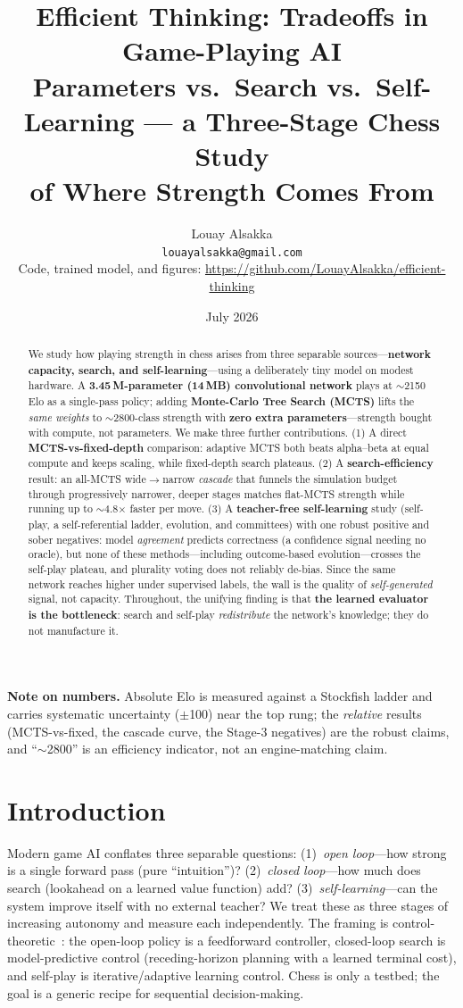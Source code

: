 \documentclass[11pt]{article}
\title{\textbf{Efficient Thinking: Tradeoffs in Game-Playing AI}\\[4pt]
\large Parameters vs.\ Search vs.\ Self-Learning --- a Three-Stage Chess Study\\ of Where Strength Comes From}
\author{Louay Alsakka\\ \small\texttt{louayalsakka@gmail.com}\\
\small Code, trained model, and figures: \url{https://github.com/LouayAlsakka/efficient-thinking}}
\date{July 2026}
\begin{document}
\maketitle

\begin{abstract}
We study how playing strength in chess arises from three separable sources---\textbf{network
capacity, search, and self-learning}---using a deliberately tiny model on modest hardware. A
\textbf{3.45\,M-parameter (14\,MB) convolutional network} plays at $\sim$2150 Elo as a single-pass
policy; adding \textbf{Monte-Carlo Tree Search (MCTS)} lifts the \emph{same weights} to
$\sim$2800-class strength with \textbf{zero extra parameters}---strength bought with compute, not
parameters. We make three further contributions. (1) A direct \textbf{MCTS-vs-fixed-depth}
comparison: adaptive MCTS both beats alpha--beta at equal compute and keeps scaling, while
fixed-depth search plateaus. (2) A \textbf{search-efficiency} result: an all-MCTS wide$\rightarrow$narrow
\emph{cascade} that funnels the simulation budget through progressively narrower, deeper stages
matches flat-MCTS strength while running up to $\sim$4.8$\times$ faster per move. (3) A
\textbf{teacher-free self-learning} study (self-play, a self-referential ladder, evolution, and
committees) with one robust positive and sober negatives: model \emph{agreement} predicts
correctness (a confidence signal needing no oracle), but none of these methods---including
outcome-based evolution---crosses the self-play plateau, and plurality voting does not reliably
de-bias. Since the same network reaches higher under supervised labels, the wall is the quality of
\emph{self-generated} signal, not capacity. Throughout, the unifying finding is that \textbf{the
learned evaluator is the bottleneck}: search and self-play \emph{redistribute} the network's
knowledge; they do not manufacture it.
\end{abstract}

\noindent\textbf{Note on numbers.} Absolute Elo is measured against a Stockfish ladder and carries
systematic uncertainty ($\pm$100) near the top rung; the \emph{relative} results (MCTS-vs-fixed, the
cascade curve, the Stage-3 negatives) are the robust claims, and ``$\sim$2800'' is an efficiency
indicator, not an engine-matching claim.

\section{Introduction}
Modern game AI conflates three separable questions: (1)~\emph{open loop}---how strong is a single
forward pass (pure ``intuition'')? (2)~\emph{closed loop}---how much does search (lookahead on a
learned value function) add? (3)~\emph{self-learning}---can the system improve itself with no
external teacher? We treat these as three stages of increasing autonomy and measure each
independently. The framing is control-theoretic~\cite{bertsekas2022lessons}: the open-loop policy is
a feedforward controller, closed-loop search is model-predictive control (receding-horizon planning
with a learned terminal cost), and self-play is iterative/adaptive learning control. Chess is only a
testbed; the goal is a generic recipe for sequential decision-making.
\end{document}
